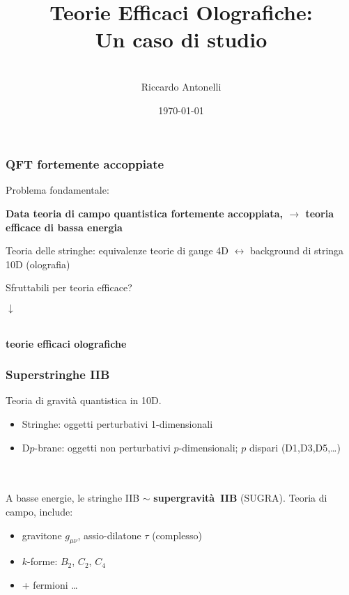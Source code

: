 \documentclass[aspectratio=43,mathserif]{beamer}
\title{Teorie Efficaci Olografiche:\\ Un caso di studio}
\author{\vspace{10pt}\\\large Riccardo Antonelli }
\date{\today}
\begin{document}
\begin{frame}
	\maketitle
\end{frame}

\begin{frame}
	\frametitle{QFT fortemente accoppiate}
	Problema fondamentale:
	\begin{center}\textbf{
		Data teoria di campo quantistica fortemente accoppiata, $\longrightarrow$ teoria efficace di bassa energia}
	\end{center}

	\vfill Teoria delle stringhe: equivalenze teorie di gauge 4D $\leftrightarrow$ background di stringa 10D (olografia)

	\vfill Sfruttabili per teoria efficace?

	\begin{center} $\downarrow$
	
		~\\
	
	\textbf{teorie efficaci olografiche}
	\end{center}

	

\end{frame}

\begin{frame}
	\frametitle{Superstringhe IIB}
	Teoria di gravità quantistica in 10D.

	\begin{itemize}
		\item Stringhe: oggetti perturbativi 1-dimensionali
		\item D$p$-brane: oggetti non perturbativi $p$-dimensionali; $p$ dispari (D1,D3,D5,\ldots)
	\end{itemize}

	~\\~\\

	A basse energie, le stringhe IIB $\sim$ \textbf{supergravità~IIB} (SUGRA). Teoria di campo, include:

	\begin{itemize}
		\item gravitone $g_{\mu\nu}$, assio-dilatone $\tau$ (complesso)
		\item $k$-forme: $B_2$, $C_2$, $C_4$
		\item + fermioni \ldots
	\end{itemize}
\end{frame}
\end{document}
